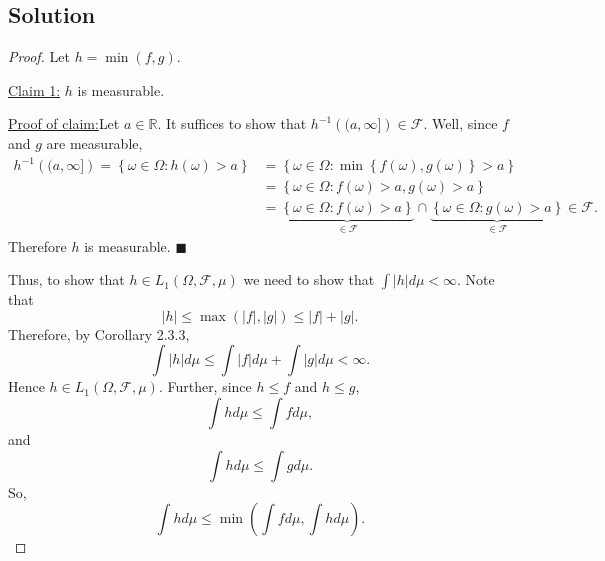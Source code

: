 \documentclass[12pt]{article}
\newenvironment{claimproof}[1]{\par\noindent\underline{Proof of claim:}\space#1}{\hfill $\blacksquare$\vspace{5mm}}
\begin{document}
\subsection*{Solution}
\begin{proof}
Let $h = \min(f,g)$.

\underline{Claim 1:} $h$ is measurable.
\begin{claimproof}
Let $a \in \mathbb{R}$. It suffices to show that $h^{-1}\left( (a,\infty] \right) \in \mathcal{F}$.
Well, since $f$ and $g$ are measurable,
\begin{align*}
h^{-1}\left( (a,\infty] \right) = \left\{ \omega \in \Omega : h(\omega) > a \right\} & = \left\{ \omega \in \Omega : \min\left\{ f(\omega),g(\omega)
\right\} > a \right\} \\
& = \left\{ \omega \in \Omega : f(\omega) > a, g(\omega) > a \right\} \\
& = \underbrace{ \left\{ \omega \in \Omega : f(\omega) > a \right\} }_{\in \mathcal{F}} \cap \underbrace{ \left\{ \omega \in \Omega : g(\omega) > a
\right\} }_{\in \mathcal{F}} \in \mathcal{F}.
\end{align*}
Therefore $h$ is measurable.
\end{claimproof}

Thus, to show that $h \in L_{1}\left( \Omega, \mathcal{F}, \mu \right)$ we need to show that $\int |h|d\mu < \infty$. Note that 
\[ |h| \leq \max(|f|, |g|) \leq |f| + |g|. \]
Therefore, by Corollary 2.3.3, 
\[ \int |h| d\mu \leq \int |f| d\mu + \int |g| d\mu < \infty. \]
Hence $h \in L_{1}\left( \Omega, \mathcal{F}, \mu \right)$. Further, since $h \leq f$ and $h \leq g$,
\[ \int hd\mu \leq \int fd\mu, \]
and 
\[ \int hd\mu \leq \int gd\mu. \]
So, 
\[ \int hd\mu \leq \min\left( \int fd\mu, \int hd\mu \right). \]
\end{proof}
\end{document}
